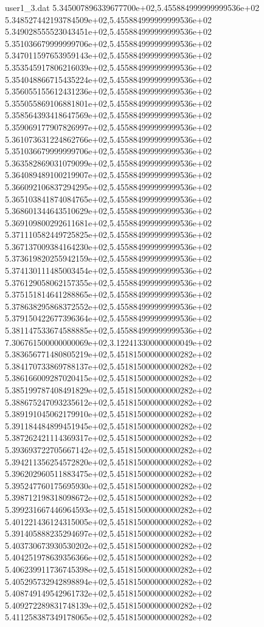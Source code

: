 \begin{filecontents}{user1_3.dat}
5.345007896339677700e+02,5.455884999999999536e+02
5.348527442193784509e+02,5.455884999999999536e+02
5.349028555523043451e+02,5.455884999999999536e+02
5.351036679999999706e+02,5.455884999999999536e+02
5.347011597653959143e+02,5.455884999999999536e+02
5.353545917806216039e+02,5.455884999999999536e+02
5.354048866715435224e+02,5.455884999999999536e+02
5.356055155612431236e+02,5.455884999999999536e+02
5.355055869106881801e+02,5.455884999999999536e+02
5.358564393418647569e+02,5.455884999999999536e+02
5.359069177907826997e+02,5.455884999999999536e+02
5.361073631224862766e+02,5.455884999999999536e+02
5.351036679999999706e+02,5.455884999999999536e+02
5.363582869031079099e+02,5.455884999999999536e+02
5.364089489100219907e+02,5.455884999999999536e+02
5.366092106837294295e+02,5.455884999999999536e+02
5.365103841874084765e+02,5.455884999999999536e+02
5.368601344643510629e+02,5.455884999999999536e+02
5.369109800292611681e+02,5.455884999999999536e+02
5.371110582449725825e+02,5.455884999999999536e+02
5.367137009384164230e+02,5.455884999999999536e+02
5.373619820255942159e+02,5.455884999999999536e+02
5.374130111485003454e+02,5.455884999999999536e+02
5.376129058062157355e+02,5.455884999999999536e+02
5.375151814641288865e+02,5.455884999999999536e+02
5.378638295868372552e+02,5.455884999999999536e+02
5.379150422677396364e+02,5.455884999999999536e+02
5.381147533674588885e+02,5.455884999999999536e+02
7.306761500000000069e+02,3.122413300000000049e+02
5.383656771480805219e+02,5.451815000000000282e+02
5.384170733869788137e+02,5.451815000000000282e+02
5.386166009287020415e+02,5.451815000000000282e+02
5.385199787408491829e+02,5.451815000000000282e+02
5.388675247093235612e+02,5.451815000000000282e+02
5.389191045062179910e+02,5.451815000000000282e+02
5.391184484899451945e+02,5.451815000000000282e+02
5.387262421114369317e+02,5.451815000000000282e+02
5.393693722705667142e+02,5.451815000000000282e+02
5.394211356254572820e+02,5.451815000000000282e+02
5.396202960511883475e+02,5.451815000000000282e+02
5.395247760175695930e+02,5.451815000000000282e+02
5.398712198318098672e+02,5.451815000000000282e+02
5.399231667446964593e+02,5.451815000000000282e+02
5.401221436124315005e+02,5.451815000000000282e+02
5.391405888235294697e+02,5.451815000000000282e+02
5.403730673930530202e+02,5.451815000000000282e+02
5.404251978639356366e+02,5.451815000000000282e+02
5.406239911736745398e+02,5.451815000000000282e+02
5.405295732942898894e+02,5.451815000000000282e+02
5.408749149542961732e+02,5.451815000000000282e+02
5.409272289831748139e+02,5.451815000000000282e+02
5.411258387349178065e+02,5.451815000000000282e+02

\end{filecontents}
